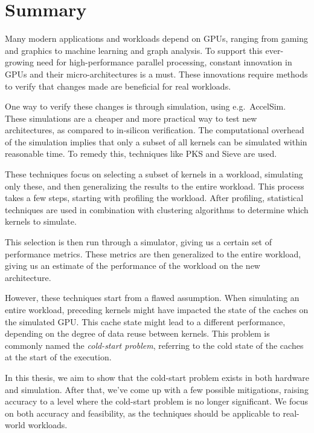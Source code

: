 
\chapter*{Summary}
Many modern applications and workloads depend on GPUs, ranging from gaming and graphics to machine learning and graph analysis.
To support this ever-growing need for high-performance parallel processing, constant innovation in GPUs and their micro-architectures is a must.
These innovations require methods to verify that changes made are beneficial for real workloads.

One way to verify these changes is through simulation, using e.g.\ AccelSim.
These simulations are a cheaper and more practical way to test new architectures, as compared to in-silicon verification.
The computational overhead of the simulation implies that only a subset of all kernels can be simulated within reasonable time.
To remedy this, techniques like PKS and Sieve are used.

These techniques focus on selecting a subset of kernels in a workload, simulating only these, and then generalizing the results to the entire workload.
This process takes a few steps, starting with profiling the workload.
After profiling, statistical techniques are used in combination with clustering algorithms to determine which kernels to simulate.

This selection is then run through a simulator, giving us a certain set of performance metrics.
These metrics are then generalized to the entire workload, giving us an estimate of the performance of the workload on the new architecture.

However, these techniques start from a flawed assumption.
When simulating an entire workload, preceding kernels might have impacted the state of the caches on the simulated GPU\@.
This cache state might lead to a different performance, depending on the degree of data reuse between kernels.
This problem is commonly named the \textit{cold-start problem}, referring to the cold state of the caches at the start of the execution.

In this thesis, we aim to show that the cold-start problem exists in both hardware and simulation.
After that, we've come up with a few possible mitigations, raising accuracy to a level where the cold-start problem is no longer significant.
We focus on both accuracy and feasibility, as the techniques should be applicable to real-world workloads.

